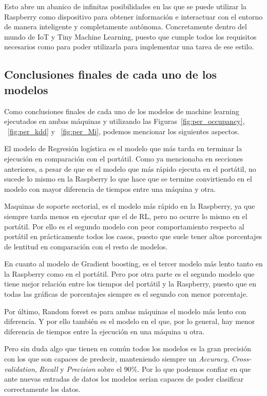 \documentclass[a4paper, 12pt]{book}
\begin{document}
Esto abre un abanico de infinitas posibilidades en las que se puede utilizar la Raspberry como dispositivo para obtener información e interactuar con el entorno de manera inteligente y completamente autónoma. Concretamente dentro del mundo de IoT y Tiny Machine Learning, puesto que cumple todos los requisitos necesarios como para poder utilizarla para implementar una tarea de ese estilo.

\subsection{Conclusiones finales de cada uno de los modelos}

Como conclusiones finales de cada uno de los modelos de machine learning ejecutados en ambas máquinas y utilizando las Figuras~\ref{fig:per_occupancy}, ~\ref{fig:per_kdd} y ~\ref{fig:per_Mi}, podemos mencionar los siguientes aspectos.

El modelo de Regresión logística es el modelo que más tarda en terminar la ejecución en comparación con el portátil. Como ya mencionaba en secciones anteriores, a pesar de que es el modelo que más rápido ejecuta en el portátil, no sucede lo mismo en la Raspberry lo que hace que se termine convirtiendo en el modelo con mayor diferencia de tiempos entre una máquina y otra. 

Maquinas de soporte sectorial, es el modelo más rápido en la Raspberry, ya que siempre tarda menos en ejecutar que el de RL, pero no ocurre lo mismo en el portátil. Por ello es el segundo modelo con peor comportamiento respecto al portátil en prácticamente todos los casos, puesto que suele tener altos porcentajes de lentitud en comparación con el resto de modelos.

En cuanto al modelo de Gradient boosting, es el tercer modelo más lento tanto en la Raspberry como en el portátil. Pero por otra parte es el segundo modelo que tiene mejor relación entre los tiempos del portátil y la Raspberry, puesto que en todas las gráficas de porcentajes siempre es el segundo con menor porcentaje.

Por último, Random forest es para ambas máquinas el modelo más lento con diferencia. Y por ello también es el modelo en el que, por lo general, hay menor diferencia de tiempos entre la ejecución en una máquina u otra.

Pero sin duda algo que tienen en común todos los modelos es la gran precisión con los que son capaces de predecir, manteniendo siempre un \textit{Accuracy}, \textit{Cross-validation}, \textit{Recall} y \textit{Precision} sobre el $90\%$. Por lo que podemos confiar en que ante nuevas entradas de datos los modelos serían capaces de poder clasificar correctamente los datos.
 
\end{document}
